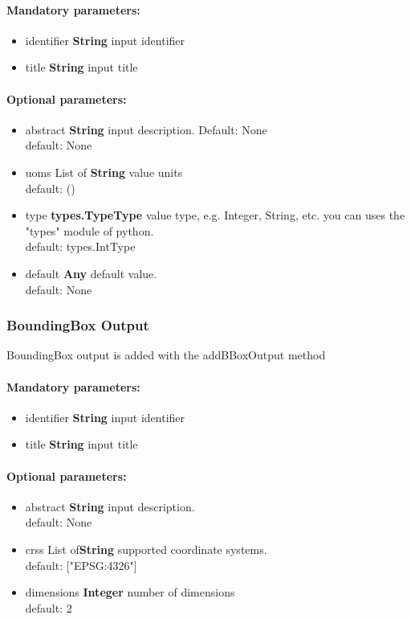 \documentclass[a4paper,11pt]{report}
\begin{document}
\paragraph{Mandatory parameters:}
\begin{itemize}
\item identifier \textbf{String} input identifier
\item title \textbf{String} input title
\end{itemize}

\paragraph{Optional parameters:}
\begin{itemize}
\item abstract \textbf{String} input description. Default: None\\
            default: None
\item uoms List of \textbf{String} value units\\
            default: ()
\item type \textbf{types.TypeType} value type, e.g. Integer, String, etc. you
            can uses the "types" module of python.\\
            default: types.IntType
\item default \textbf{Any} default value.\\
            default: None
\end{itemize}

\subsubsection{BoundingBox Output}
BoundingBox output is added with the addBBoxOutput method

\paragraph{Mandatory parameters:}
\begin{itemize}
\item identifier \textbf{String} input identifier
\item title \textbf{String} input title
\end{itemize}

\paragraph{Optional parameters:}
\begin{itemize}
\item abstract \textbf{String} input description.\\
        default: None
\item crss List of\textbf {String} supported coordinate systems.\\
        default: ["EPSG:4326"]
\item dimensions \textbf{Integer} number of dimensions\\
        default: 2
\end{itemize}
\end{document}
